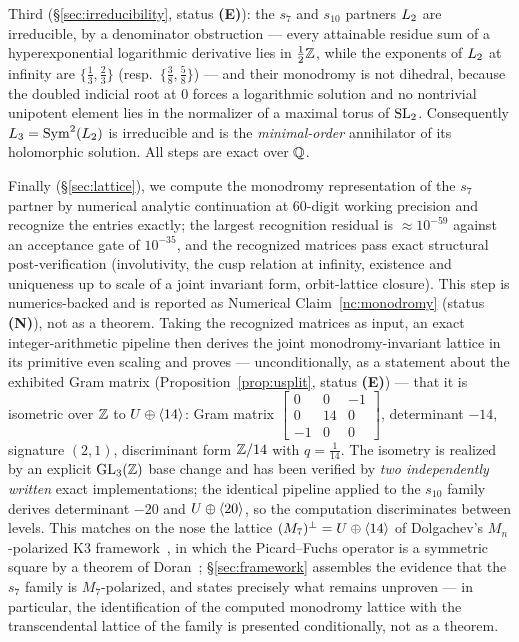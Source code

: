 Third (\S\ref{sec:irreducibility}, status \textbf{(E)}): the $s_7$ and
$s_{10}$ partners $L_2$ are irreducible, by a denominator obstruction ---
every attainable residue sum of a hyperexponential logarithmic derivative lies
in $\tfrac12\mathbb{Z}$, while the exponents of $L_2$ at infinity are
$\{\tfrac13,\tfrac23\}$ (resp.\ $\{\tfrac38,\tfrac58\}$) --- and their
monodromy is not dihedral, because the doubled indicial root at $0$ forces a
logarithmic solution and no nontrivial unipotent element lies in the
normalizer of a maximal torus of $\operatorname{SL}_2$. Consequently
$L_3 = \operatorname{Sym}^2(L_2)$ is irreducible and is the \emph{minimal-order}
annihilator of its holomorphic solution. All steps are exact over $\mathbb{Q}$.

Finally (\S\ref{sec:lattice}), we compute the monodromy representation of the
$s_7$ partner by numerical analytic continuation at 60-digit working
precision and recognize the entries exactly; the largest recognition residual
is ${\approx}10^{-59}$ against an acceptance gate of $10^{-35}$, and the
recognized matrices pass exact structural post-verification (involutivity,
the cusp relation at infinity, existence and uniqueness up to scale of a
joint invariant form, orbit-lattice closure). This step is numerics-backed
and is reported as Numerical Claim~\ref{nc:monodromy} (status \textbf{(N)}),
not as a theorem. Taking the recognized matrices as input, an exact
integer-arithmetic pipeline then derives the joint monodromy-invariant
lattice in its primitive even scaling and proves --- unconditionally, as a
statement about the exhibited Gram matrix (Proposition~\ref{prop:usplit},
status \textbf{(E)}) --- that it is isometric over $\mathbb{Z}$ to
$U\oplus\langle 14\rangle$: Gram matrix
$\left[\begin{smallmatrix}0&0&-1\\0&14&0\\-1&0&0\end{smallmatrix}\right]$,
determinant $-14$, signature $(2,1)$, discriminant form $\mathbb{Z}/14$ with
$q=\tfrac1{14}$. The isometry is realized by an explicit $\operatorname{GL}_3(\mathbb{Z})$ base
change and has been verified by \emph{two independently written} exact
implementations; the identical pipeline applied to the $s_{10}$ family
derives determinant $-20$ and $U\oplus\langle 20\rangle$, so the computation
discriminates between levels. This matches on the nose the lattice
$(M_7)^{\perp} = U\oplus\langle 14\rangle$ of Dolgachev's $M_n$-polarized K3
framework~\cite{Dolgachev1996}, in which the Picard--Fuchs operator is a
symmetric square by a theorem of Doran~\cite{Doran2000}; \S\ref{sec:framework}
assembles the evidence that the $s_7$ family is $M_7$-polarized, and states
precisely what remains unproven --- in particular, the identification of the
computed monodromy lattice with the transcendental lattice of the family is
presented conditionally, not as a theorem.

